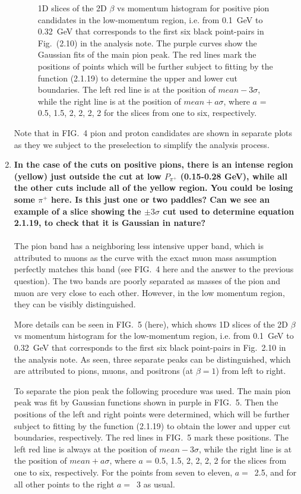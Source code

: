 \documentclass[,superscriptaddress,showpacs,amssymb,amsmath,amsfonts,linenumbers,article]{revtex4-1}
\begin{document}
\begin{enumerate}[label=\textbf{\arabic*}.]
\begin{figure}[!ht]
\begin{center}
\end{center}
\caption{\small 1D slices of the 2D $\beta$ vs momentum histogram for positive pion candidates in the low-momentum region, i.e. from 0.1~GeV to 0.32~GeV that corresponds to the first six black point-pairs in Fig.~(2.10) in the analysis note. The purple curves show the Gaussian fits of the main pion peak. The red lines mark the positions of points which will be further subject to fitting by the function (2.1.19) to determine the upper and lower cut boundaries. The left red line is at the position of $mean-3\sigma$, while the right line is at the position of $mean+a\sigma$, where $a$ = 0.5, 1.5, 2, 2, 2, 2 for the slices from one to six, respectively. }  
\end{figure}

Note that in FIG.~4 pion and proton candidates are shown in separate plots as they we subject to the preselection to simplify the analysis process.

\item {\bf In the case of the cuts on positive pions, there is an intense region (yellow) just outside the cut at low $P_{\pi^{+}}$ (0.15-0.28 GeV), while all the other cuts include all of the yellow region. You could be losing some $\pi^{+}$ here. Is this just one or two paddles? Can we see an example of a slice showing the $\pm 3 \sigma$ cut used to determine equation 2.1.19, to check that it is Gaussian in nature?}\\ \\
The pion band has a neighboring less intensive upper band, which is attributed to muons as the curve with the exact muon mass assumption perfectly matches this band (see FIG.~4 here and the answer to the previous question). The two bands are poorly separated as masses of the pion and muon are very close to each other. However, in the low momentum region, they can be visibly distinguished.

More details can be seen in FIG.~5 (here), which shows 1D slices of the 2D $\beta$ vs momentum histogram for the low-momentum region, i.e. from 0.1~GeV to 0.32~GeV that corresponds to the first six black point-pairs in Fig.~2.10 in the analysis note. As seen, three separate peaks can be distinguished, which are attributed to pions, muons, and positrons (at $\beta = 1$) from left to right.

To separate the pion peak the following procedure was used. The main pion peak was fit by Gaussian functions shown in purple in FIG.~5. Then the positions of the left and right points were determined, which will be further subject to fitting by the function (2.1.19) to obtain the lower and upper cut boundaries, respectively. The red lines in FIG.~5 mark these positions. The left red line is always at the position of $mean-3\sigma$, while the right line is at the position of $mean+a\sigma$, where $a$ = 0.5, 1.5, 2, 2, 2, 2 for the slices from one to six, respectively. For the points from seven to eleven, $a = $~2.5, and for all other points to the right $a = $~3 as usual.


\end{enumerate}
\end{document}
